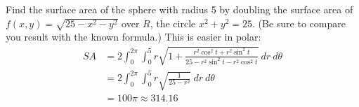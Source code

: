 {Find the surface area of the sphere with radius 5 by doubling the surface area of $f(x,y) = \sqrt{25-x^2-y^2}$ over $R$, the circle $x^2+y^2=25$. (Be sure to compare you result with the known formula.)
}
{This is easier in polar:
\begin{align*}SA &= 2\int_{0}^{2\pi}\int_{0}^{5} r\sqrt{1+ \frac{r^2\cos^2t+r^2\sin^2t}{25-r^2\sin^2t-r^2\cos^2t}}\ dr\ d\theta\\
		&= 2\int_0^{2\pi}\int_0^5r\sqrt{\frac{1}{25-r^2}}\ dr\ d\theta \\
		&= 100\pi\approx 314.16
\end{align*}
}
